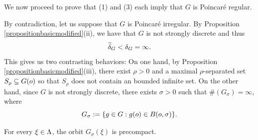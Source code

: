 We now proceed to prove that (1) and (3) each imply that $G$ is Poincar\'e regular.

By contradiction, let us suppose that $G$ is Poincar\'e irregular. By Proposition \ref{propositionbasicmodified}(ii), we have that $G$ is not strongly discrete and thus
\[
\widetilde\delta_G < \delta_G = \infty.
\]
This gives us two contrasting behaviors: On one hand, by Proposition \ref{propositionbasicmodified}(iii), there exist $\rho > 0$ and a maximal $\rho$-separated set $S_\rho\subseteq G(o)$ so that $S_\rho$ does not contain an bounded infinite set. On the other hand, since $G$ is not strongly discrete, there exists $\sigma > 0$ such that $\#(G_\sigma) = \infty$, where
\[
G_\sigma := \{g\in G:g(o)\in B(o,\sigma)\}.
\]
\begin{claim}
\label{claimprecompact}
For every $\xi\in\Lambda$, the orbit $G_\sigma(\xi)$ is precompact.
\end{claim}

